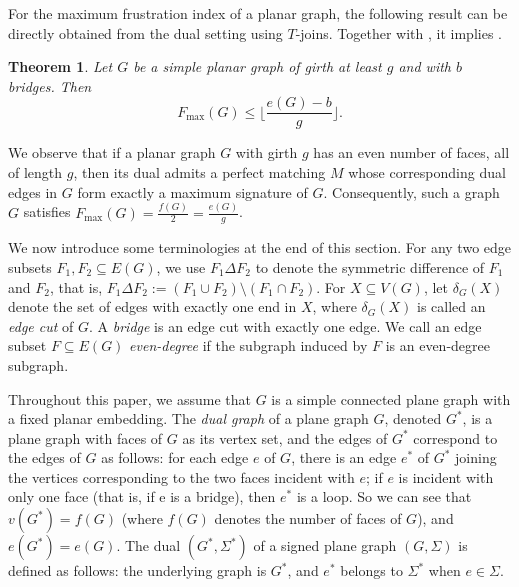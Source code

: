 \documentclass[a4paper,12pt]{article}
\theoremstyle{plain}
\newtheorem{theorem}{Theorem}[section]
\theoremstyle{definition}
\theoremstyle{remark}
\numberwithin{equation}{section}
\newcommand{\Chen}[1]{{\color{myblue} [Chen: #1]}}
\begin{document}
For the maximum frustration index of a planar graph, the following result can be directly obtained from the dual setting using $T$-joins. Together with , it implies .

\begin{theorem}\label{prop:fmax}
Let $G$ be a simple planar graph of girth at least $g$ and with $b$ bridges. Then
$$
F_{\max}(G) \leq \lfloor \frac{e(G)-b}{g}\rfloor.
$$
\end{theorem}

We observe that if a planar graph $G$ with girth $g$ has an even number of faces, all of length $g$, then its dual admits a perfect matching $M$ whose corresponding dual edges in $G$ form exactly a maximum signature of $G$. Consequently, such a graph $G$ satisfies $F_{\max}(G)=\frac{f(G)}{2}=\frac{e(G)}{g}$. 


\medskip
We now introduce some terminologies at the end of this section. For any two edge subsets $F_1, F_2\subseteq E(G)$, we use $F_1\Delta F_2$ to denote the symmetric difference of $F_1$ and $F_2$, that is, $F_1\Delta F_2:=(F_1\cup F_2)\setminus (F_1\cap F_2)$. For $X\subseteq V(G)$, let $\delta_G(X)$ denote the set of edges with exactly one end in $X$, where $\delta_G(X)$ is called an \emph{edge cut} of $G$. A \emph{bridge} is an edge cut with exactly one edge. We call an edge subset $F\subseteq E(G)$ \emph{even-degree} if the subgraph induced by $F$ is an even-degree subgraph.


Throughout this paper, we assume that $G$ is a simple connected plane graph with a fixed planar embedding. The \emph{dual graph} of a plane graph $G$, denoted $G^*$, is a plane graph with faces of $G$ as its vertex set, and the edges of $G^*$ correspond to the edges of $G$ as follows: for each edge $e$ of $G$, there is an edge $e^*$ of $G^*$ joining the vertices corresponding to the two faces incident with $e$; if $e$ is incident with only one face (that is, if e is a bridge), then $e^*$ is a loop. So we can see that $v(G^*)=f(G)$ (where $f(G)$ denotes the number of faces of $G$), and $e(G^*)=e(G)$. The dual $(G^*,\Sigma^*)$ of a signed plane graph $(G,\Sigma)$ is defined as follows: the underlying graph is $G^*$, and $e^*$ belongs to $\Sigma^*$ when $e\in \Sigma$.
\end{document}
